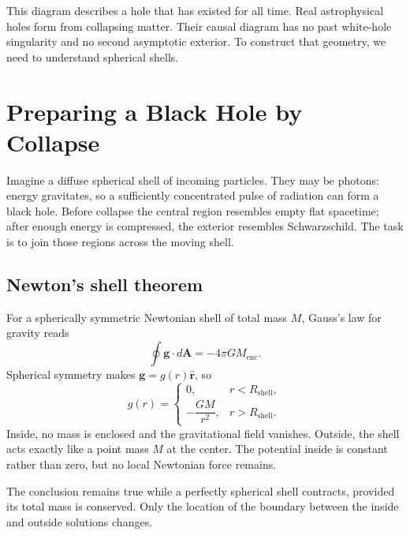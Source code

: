 This diagram describes a hole that has existed for all time. Real astrophysical holes form from collapsing matter. Their causal diagram has no past white-hole singularity and no second asymptotic exterior. To construct that geometry, we need to understand spherical shells.

\section{Preparing a Black Hole by Collapse}

Imagine a diffuse spherical shell of incoming particles. They may be photons: energy gravitates, so a sufficiently concentrated pulse of radiation can form a black hole. Before collapse the central region resembles empty flat spacetime; after enough energy is compressed, the exterior resembles Schwarzschild. The task is to join those regions across the moving shell.

\subsection{Newton's shell theorem}

For a spherically symmetric Newtonian shell of total mass \(M\), Gauss's law for gravity reads
\begin{equation}
\oint \mathbf{g}\cdot d\mathbf{A}=-4\pi G M_{\mathrm{enc}}.
\label{eq:l04-gauss-gravity}
\end{equation}
Spherical symmetry makes \(\mathbf{g}=g(r)\hat{\mathbf r}\), so
\begin{equation}
g(r)=
\begin{cases}
0, & r<R_{\mathrm{shell}},\\[4pt]
-\dfrac{GM}{r^2}, & r>R_{\mathrm{shell}}.
\end{cases}
\label{eq:l04-shell-field}
\end{equation}
Inside, no mass is enclosed and the gravitational field vanishes. Outside, the shell acts exactly like a point mass \(M\) at the center. The potential inside is constant rather than zero, but no local Newtonian force remains.

The conclusion remains true while a perfectly spherical shell contracts, provided its total mass is conserved. Only the location of the boundary between the inside and outside solutions changes.

